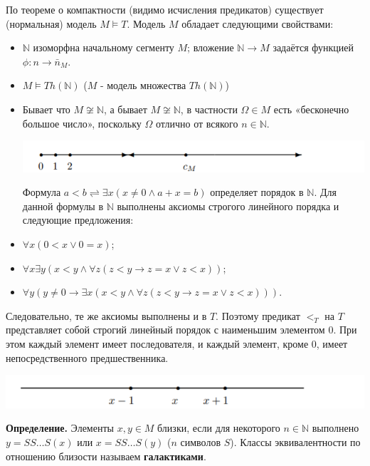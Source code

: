 По теореме о компактности (видимо исчисления предикатов) существует (нормальная) модель $M \vDash T$. Модель $M$ обладает следующими свойствами:
\begin{itemize}
\item $\mathbb{N}$ изоморфна начальному сегменту $M$; вложение $\mathbb{N} \rightarrow M$ задаётся функцией $\phi : n \rightarrow \bar n_M$.

\item $M \vDash Th(\mathbb{N})$ ($M$ - модель множества $Th(\mathbb{N})$)

\item Бывает что $M \not \cong \mathbb{N}$, а бывает $M \not \cong \mathbb{N}$, в частности $\Omega \in M$ есть «бесконечно большое число», поскольку $\Omega$ отлично от всякого $n \in \mathbb{N}$.

\includegraphics[scale=1]{images/1.16_стрелка1.PNG}

Формула $a < b \rightleftharpoons \exists x(x \neq 0 \wedge a + x = b)$ определяет порядок в $\mathbb{N}$. Для данной формулы в $\mathbb{N}$ выполнены аксиомы строгого линейного порядка и следующие
предложения:
\item $\forall x (0 < x \vee 0 = x)$;
\item $\forall x\exists y (x < y \wedge \forall z (z < y \rightarrow  z = x \vee z < x))$;
\item $\forall y (y \neq 0 \rightarrow  \exists x (x < y \wedge \forall z (z < y \rightarrow  z = x \vee z < x)))$.
\end{itemize}

Следовательно, те же аксиомы выполнены и в $T$. Поэтому предикат $<_T$ на $T$ представляет собой строгий линейный порядок с наименьшим элементом $0$. При этом каждый элемент имеет последователя, и каждый элемент, кроме $0$, имеет непосредственного предшественника.

\includegraphics[scale=1]{images/1.16_стрелка2.PNG}

\textbf{Определение.} Элементы $x, y \in  M$ близки, если для некоторого $n \in  \mathbb{N}$ выполнено $y = SS \ldots S(x)$ или $x = SS \ldots S(y)$ ($n$ символов $S$).
Классы эквивалентности по отношению близости называем \textbf{галактиками}.

